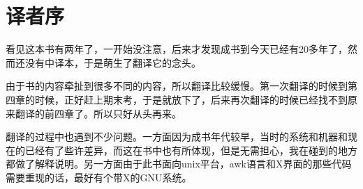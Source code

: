 \chapter{译者序}

看见这本书有两年了，一开始没注意，后来才发现成书到今天已经有20多年了，然而还没有中译本，于是萌生了翻译它的念头。

由于书的内容牵扯到很多不同的内容，所以翻译比较缓慢。第一次翻译的时候到第四章的时候，正好赶上期末考，于是就放下了，后来再次翻译的时候已经找不到原来翻译的前四章了。所以只好从头再来。

翻译的过程中也遇到不少问题。一方面因为成书年代较早，当时的系统和机器和现在的已经有了些许差异，而这在书中也有所体现，但是无需担心，我在碰到的地方都做了解释说明。另一方面由于此书面向unix平台，awk语言和X界面的那些代码需要重现的话，最好有个带X的GNU系统。
